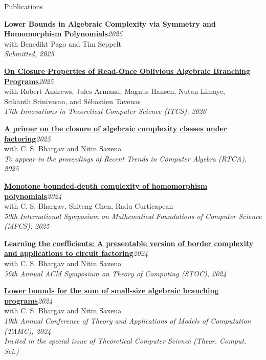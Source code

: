 \documentclass{resume} %
\begin{document}

\begin{rSection}{Publications}
    \item {\bf Lower Bounds in Algebraic Complexity via Symmetry and \\ Homomorphism Polynomials}\hfill \emph{2025}\\
    {with Benedikt Pago and Tim Seppelt}\\
    {\em Submitted, 2025}

    \item {\bf \href{https://arxiv.org/abs/2509.10725}{On Closure Properties of Read-Once Oblivious Algebraic Branching Programs}}\hfill \emph{2025}\\
    {with Robert Andrews, Jules Armand, Magnus Hansen, Nutan Limaye,\\ Srikanth Srinivasan, and Sébastien Tavenas}\\
    {\em 17th Innovations in Theoretical Computer Science (ITCS), 2026}

    \item {\bf \href{https://arxiv.org/abs/2506.19604}{A primer on the closure of algebraic complexity classes under factoring}}\hfill \emph{2025}\\
    {with C. S. Bhargav and Nitin Saxena}\\
    {\em To appear in the proceedings of Recent Trends in Computer Algebra (RTCA), 2025}

    \item {\bf \href{https://arxiv.org/abs/2505.22894}{Monotone bounded-depth complexity of homomorphism polynomials}}\hfill \emph{2024}\\
    {with C. S. Bhargav, Shiteng Chen, Radu Curticapean}\\
    {\em 50th International Symposium on Mathematical Foundations of Computer Science (MFCS), 2025}

    \item {\bf \href{https://www.prateekdwivedi.in/papers/PresentableVNP-confversion.pdf}{Learning the coefficients: A presentable version of border complexity\\ and applications to circuit factoring}}\hfill \emph{2024}\\
    {with C. S. Bhargav and Nitin Saxena}\\
    {\em 56th Annual ACM Symposium on Theory of Computing (STOC), 2024}
    
    \item {\bf \href{https://www.prateekdwivedi.in/papers/smABP-lowerbounds-confversion.pdf}{Lower bounds for the sum of small-size algebraic branching programs}}\hfill \emph{2024} \\
    {with C. S. Bhargav and Nitin Saxena}\\
    {\em 19th Annual Conference of Theory and Applications of Models of Computation (TAMC), 2024}\\
    {\em\color{highlight}Invited in the special issue of Theoretical Computer Science (Theor. Comput. Sci.)}


\end{rSection}
\end{document}
